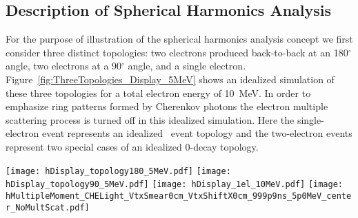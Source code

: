 \subsection{Description of Spherical Harmonics Analysis}

For the purpose of illustration of the spherical harmonics analysis concept we first consider three distinct topologies: 
two electrons produced back-to-back at an 180$^{\circ}$ angle, two electrons at a 90$^{\circ}$ angle, and a single electron.
Figure~\ref{fig:ThreeTopologies_Display_5MeV} shows an idealized simulation of these three topologies for a total electron 
energy of 10~MeV. In order to emphasize ring patterns formed by Cherenkov photons the electron multiple scattering process is turned off
in this idealized simulation. Here the single-electron event represents an idealized \B~event topology and the two-electron events represent
two special cases of an idealized 0\nbb-decay topology.


\begin{figure*}[h]
  \centering
  \texttt{[image: hDisplay\_topology180\_5MeV.pdf]}
  \texttt{[image: hDisplay\_topology90\_5MeV.pdf]}
  \texttt{[image: hDisplay\_1el\_10MeV.pdf]}
  \texttt{[image: hMultipleMoment\_CHELight\_VtxSmear0cm\_VtxShiftX0cm\_999p9ns\_5p0MeV\_center\_NoMultScat.pdf]}
  \caption{\emph{Top panels and bottom left panel:} Idealized event displays for the three representative event topologies: two 5~MeV 
    back-to-back electrons (\emph{top left}), two 5~MeV electrons at 90$^{\circ}$ angle (\emph{top right}), and a single 10~MeV electron
    (\emph{bottom right}). Multiple scattering is turned off in the simulation to emphasize the difference in the mutual orientation of
    Cherenkov rings for the three topologies. For the illustration purposes 100\% QE is applied to Cherenkov photons (triangles)
    and the default QE is applied to scintillation photons (dots). All electrons originate at the center of the
    detector. One typical event is shown for each topology.
    \emph{Bottom right panel:} Normalized power spectrum $S_l$ calculated for distribution of Cherenkov photons only. The three
    topologies are compared: two 5~MeV back-to-back electrons (\emph{solid red line}), two 5~MeV electrons at 90$^{\circ}$ angle
    (\emph{dotted magenta line}), and a single 10~MeV electron (\emph{dashed blue line}). For each topology 100 events were simulated. 
    The normalized power values $S_l$'s were calculated for each individual event. The horizontal lines correspond to the mean values of 
    $S_l$ within each event topology. The vertical bars show one standard deviation from the mean value.}
  \label{fig:ThreeTopologies_Display_5MeV}
\end{figure*}



